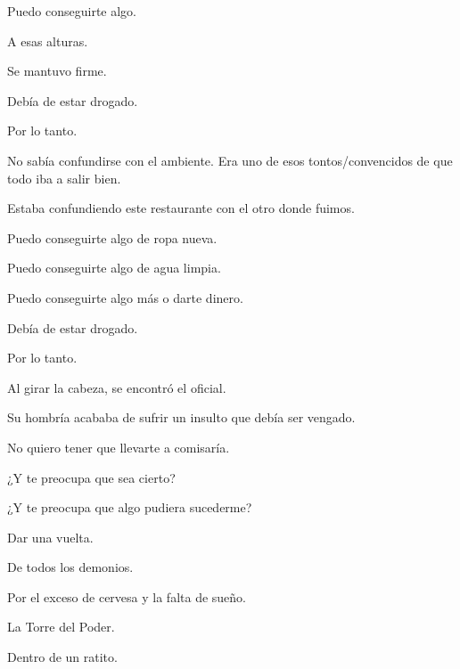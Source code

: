 \sk
Puedo conseguirte algo. 

\sk
A esas alturas. 

\sk
Se mantuvo firme. 

\sk
Debía de estar drogado. 

\sk
Por lo tanto. 

\sk
No sabía confundirse con el ambiente. Era uno de esos tontos/convencidos de que todo iba a salir bien. 

\sk
Estaba confundiendo este restaurante con el otro donde fuimos. 

\sk
Puedo conseguirte algo de ropa nueva. 

\sk
Puedo conseguirte algo de agua limpia. 

\sk
Puedo conseguirte algo más o darte dinero. 

\sk
Debía de estar drogado. 

\sk
Por lo tanto. 

\sk
Al girar la cabeza, se encontró el oficial. \nb{}

\sk
Su hombría acababa de sufrir un insulto que debía ser vengado. 

\sk
No quiero tener que llevarte a comisaría. 

\sk
¿Y te preocupa que sea cierto? 

\sk
¿Y te preocupa que algo pudiera sucederme? 

\sk
Dar una vuelta. 

\sk
De todos los demonios. 

\sk
Por el exceso de cervesa y la falta de sueño. \nb{}

\sk
La Torre del Poder. 

\sk
Dentro de un ratito. 

